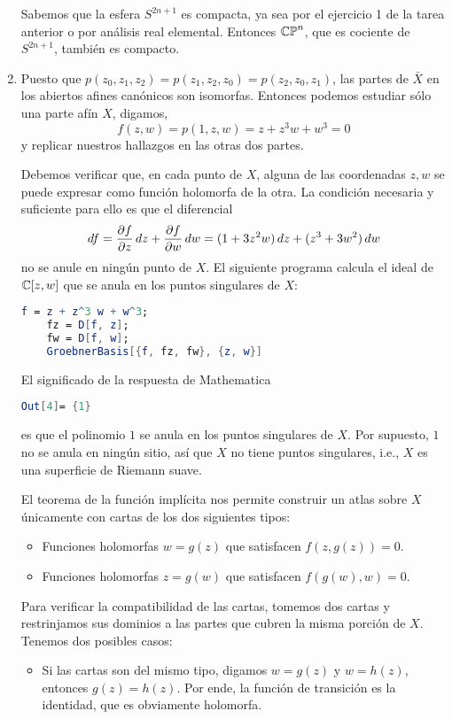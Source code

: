 \begin{solution}
\begin{enumerate}[label=\alph*)]
    Sabemos que la esfera $S^{2n+1}$ es compacta, ya sea por el ejercicio 1 de la tarea anterior o por análisis real elemental. Entonces $\mathbb {CP}^n$, que es cociente de $S^{2n+1}$, también es compacto.
    
    \item Puesto que $p(z_0, z_1, z_2) = p(z_1, z_2, z_0) = p(z_2, z_0, z_1)$, las partes de $\bar X$ en los abiertos afines canónicos son isomorfas. Entonces podemos estudiar sólo una parte afín $X$, digamos,
    $$f(z, w) = p(1, z, w) = z + z^3 w + w^3 = 0$$
    y replicar nuestros hallazgos en las otras dos partes.
    
    Debemos verificar que, en cada punto de $X$, alguna de las coordenadas $z, w$ se puede expresar como función holomorfa de la otra. La condición necesaria y suficiente para ello es que el diferencial
    $$df = \frac {\partial f} {\partial z} \, dz + \frac {\partial f} {\partial w} \, dw = (1 + 3z^2 w) \, dz + (z^3 + 3w^2) \, dw$$
    no se anule en ningún punto de $X$. El siguiente programa calcula el ideal de $\mathbb C[z, w]$ que se anula en los puntos singulares de $X$:
    \begin{lstlisting}[language=Mathematica]
    f = z + z^3 w + w^3;
    fz = D[f, z];
    fw = D[f, w];
    GroebnerBasis[{f, fz, fw}, {z, w}]
    \end{lstlisting}
    
    El significado de la respuesta de Mathematica
    \begin{lstlisting}[language=Mathematica]
    Out[4]= {1}
    \end{lstlisting}
    es que el polinomio $1$ se anula en los puntos singulares de $X$. Por supuesto, $1$ no se anula en ningún sitio, así que $X$ no tiene puntos singulares, i.e., $X$ es una superficie de Riemann suave.
    
    El teorema de la función implícita nos permite construir un atlas sobre $X$ únicamente con cartas de los dos siguientes tipos:
    \begin{itemize}
        \item Funciones holomorfas $w = g(z)$ que satisfacen $f(z, g(z)) = 0$.
        \item Funciones holomorfas $z = g(w)$ que satisfacen $f(g(w), w) = 0$.
    \end{itemize}
    
    Para verificar la compatibilidad de las cartas, tomemos dos cartas y restrinjamos sus dominios a las partes que cubren la misma porción de $X$. Tenemos dos posibles casos:
    \begin{itemize}
        \item Si las cartas son del mismo tipo, digamos $w = g(z)$ y $w = h(z)$, entonces $g(z) = h(z)$. Por ende, la función de transición es la identidad, que es obviamente holomorfa.
        

\end{itemize}
\end{enumerate}
\end{solution}
